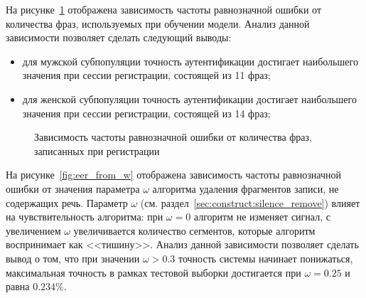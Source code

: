 На рисунке~\ref{fig:eer_from_n} отображена зависимость частоты равнозначной ошибки от количества фраз, используемых при обучении модели. Анализ данной зависимости позволяет сделать следующий выводы:
\begin{itemize}
\item для мужской субпопуляции точность аутентификации достигает наибольшего значения при сессии регистрации, состоящей из 11 фраз;
\item для женской субпопуляции точность аутентификации достигает наибольшего значения при сессии регистрации, состоящей из 14 фраз;
\end{itemize}

\begin{figure}[ht!]
\caption{Зависимость частоты равнозначной ошибки от количества фраз, записанных при регистрации}
\label{fig:eer_from_n}
\end{figure}

На рисунке~\ref{fig:eer_from_w} отображена зависимость частоты равнозначной ошибки от значения параметра $\omega$ алгоритма удаления фрагментов записи, не содержащих речь. Параметр $\omega$ (см. раздел~\ref{sec:construct:silence_remove}) влияет на чувствительность алгоритма: при $\omega = 0$ алгоритм не изменяет сигнал, с увеличением $\omega$ увеличивается количество сегментов, которые алгоритм воспринимает как <<тишину>>. Анализ данной зависимости позволяет сделать вывод о том, что при значении $\omega > 0.3$ точность системы начинает понижаться, максимальная точность в рамках тестовой выборки достигается при $\omega = 0.25$ и равна $0.234\%$.

